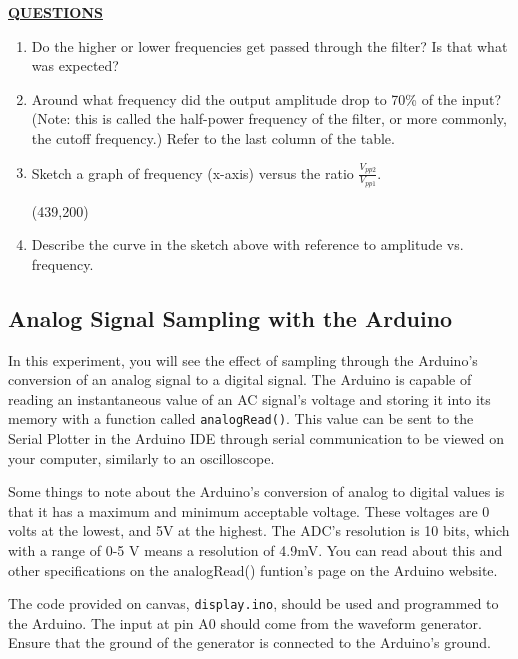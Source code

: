 \documentclass[12pt]{article}
\begin{document}
\textbf{\underline{QUESTIONS}}
\begin{enumerate}
    \item Do the higher or lower frequencies get passed through the filter?  Is that what was expected?
        \fillwithlines{1in}

    \item Around what frequency did the output amplitude drop to 70\% of the input? (Note: this is called the half-power frequency of the filter, or more commonly, the cutoff frequency.) Refer to the last column of the table.
    
    \item Sketch a graph of frequency (x-axis) versus the ratio $\frac{V_{pp2}}{V_{pp1}}$.
    
        \framebox(439,200){}
        
    \item Describe the curve in the sketch above with reference to amplitude vs. frequency.
    
\end{enumerate}         

\checkoffsubsub %

\subsection{Analog Signal Sampling with the Arduino}
In this experiment, you will see the effect of sampling through the Arduino's conversion of an analog signal to a digital signal. The Arduino is capable of reading an instantaneous value of an AC signal's voltage and storing it into its memory with a function called \texttt{analogRead()}. This value can be sent to the Serial Plotter in the Arduino IDE through serial communication to be viewed on your computer, similarly to an oscilloscope.

Some things to note about the Arduino's conversion of analog to digital values is that it has a maximum and minimum acceptable voltage. These voltages are 0 volts at the lowest, and 5V at the highest. The ADC's resolution is 10 bits, which with a range of 0-5 V means a resolution of 4.9mV. You can read about this and other specifications on the analogRead() funtion's page on the Arduino website.

The code provided on canvas, \texttt{display.ino}, should be used and programmed to the Arduino. The input at pin A0 should come from the waveform generator. Ensure that the ground of the generator is connected to the Arduino's ground. 
\end{document}

